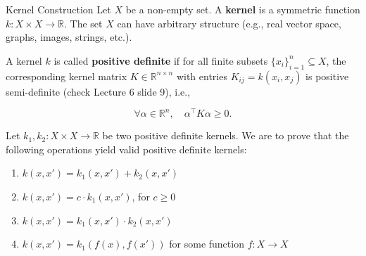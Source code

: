 \documentclass[
	english,
        solution=true
	]{tudaexercise}
\begin{document}
\begin{task}[points=8]{Kernel Construction}
Let \( X \) be a non-empty set. A \textbf{kernel} is a symmetric function \( k : X \times X \rightarrow \mathbb{R} \). The set \( X \) can have arbitrary structure (e.g., real vector space, graphs, images, strings, etc.). 

A kernel \( k \) is called \textbf{positive definite} if for all finite subsets \( \{x_i\}_{i=1}^n \subseteq X \), the corresponding kernel matrix \( K \in \mathbb{R}^{n \times n} \) with entries \( K_{ij} = k(x_i, x_j) \) is positive semi-definite (check Lecture 6 slide 9), i.e.,

\[
\forall \alpha \in \mathbb{R}^n,\quad \alpha^\top K \alpha \geq 0.
\]

Let \( k_1, k_2 : X \times X \rightarrow \mathbb{R} \) be two positive definite kernels. We are to prove that the following operations yield valid positive definite kernels:

\begin{enumerate}
    \item \( k(x, x') = k_1(x, x') + k_2(x, x') \) 
    \item \( k(x, x') = c \cdot k_1(x, x') \), for \( c \geq 0 \) 
    \item \( k(x, x') = k_1(x, x') \cdot k_2(x, x') \) 
    \item \( k(x, x') = k_1(f(x), f(x')) \) for some function \( f : X \rightarrow X \) 
\end{enumerate}


\begin{solution}

\end{solution}


\end{task}
\end{document}
